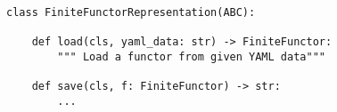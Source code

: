 \begin{verbatim}
class FiniteFunctorRepresentation(ABC):

    def load(cls, yaml_data: str) -> FiniteFunctor:
        """ Load a functor from given YAML data"""

    def save(cls, f: FiniteFunctor) -> str:
        ...
\end{verbatim}